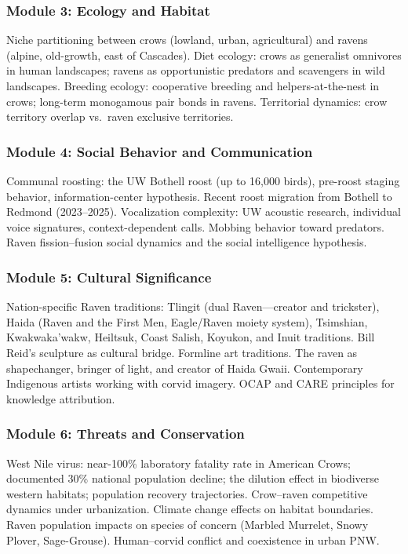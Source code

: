 \documentclass[11pt,letterpaper]{article}
\begin{document}
\subsubsection{Module 3: Ecology and Habitat}
Niche partitioning between crows (lowland, urban, agricultural) and ravens (alpine, old-growth, east of Cascades). Diet ecology: crows as generalist omnivores in human landscapes; ravens as opportunistic predators and scavengers in wild landscapes. Breeding ecology: cooperative breeding and helpers-at-the-nest in crows; long-term monogamous pair bonds in ravens. Territorial dynamics: crow territory overlap vs.\ raven exclusive territories.

\subsubsection{Module 4: Social Behavior and Communication}
Communal roosting: the UW Bothell roost (up to 16,000 birds), pre-roost staging behavior, information-center hypothesis. Recent roost migration from Bothell to Redmond (2023--2025). Vocalization complexity: UW acoustic research, individual voice signatures, context-dependent calls. Mobbing behavior toward predators. Raven fission--fusion social dynamics and the social intelligence hypothesis.

\subsubsection{Module 5: Cultural Significance}
Nation-specific Raven traditions: Tlingit (dual Raven---creator and trickster), Haida (Raven and the First Men, Eagle/Raven moiety system), Tsimshian, Kwakwaka'wakw, Heiltsuk, Coast Salish, Koyukon, and Inuit traditions. Bill Reid's sculpture as cultural bridge. Formline art traditions. The raven as shapechanger, bringer of light, and creator of Haida Gwaii. Contemporary Indigenous artists working with corvid imagery. OCAP\textregistered{} and CARE principles for knowledge attribution.

\subsubsection{Module 6: Threats and Conservation}
West Nile virus: near-100\% laboratory fatality rate in American Crows; documented 30\% national population decline; the dilution effect in biodiverse western habitats; population recovery trajectories. Crow--raven competitive dynamics under urbanization. Climate change effects on habitat boundaries. Raven population impacts on species of concern (Marbled Murrelet, Snowy Plover, Sage-Grouse). Human--corvid conflict and coexistence in urban PNW.
\end{document}
